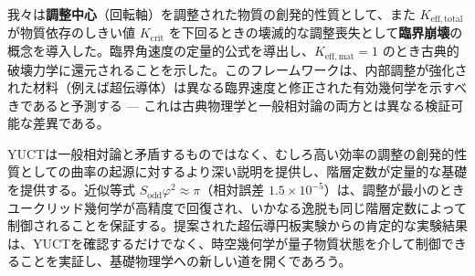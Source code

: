 \documentclass[12pt,a4paper]{article}
\newcommand{\Sodd}{S_{\mathrm{odd}}}
\newcommand{\Keffmat}{K_{\mathrm{eff,mat}}}
\newcommand{\Kefftot}{K_{\mathrm{eff,total}}}
\newcommand{\Kcrit}{K_{\mathrm{crit}}}
\begin{document}
	我々は\textbf{調整中心}（回転軸）を調整された物質の創発的性質として、また \(\Kefftot\) が物質依存のしきい値 \(\Kcrit\) を下回るときの壊滅的な調整喪失として\textbf{臨界崩壊}の概念を導入した。臨界角速度の定量的公式を導出し、\(\Keffmat=1\) のとき古典的破壊力学に還元されることを示した。このフレームワークは、内部調整が強化された材料（例えば超伝導体）は異なる臨界速度と修正された有効幾何学を示すべきであると予測する — これは古典物理学と一般相対論の両方とは異なる検証可能な差異である。
	
	YUCTは一般相対論と矛盾するものではなく、むしろ高い効率の調整の創発的性質としての曲率の起源に対するより深い説明を提供し、階層定数が定量的な基礎を提供する。近似等式 \(\Sodd \varphi^2 \approx \pi\)（相対誤差 \(1.5\times10^{-5}\)）は、調整が最小のときユークリッド幾何学が高精度で回復され、いかなる逸脱も同じ階層定数によって制御されることを保証する。提案された超伝導円板実験からの肯定的な実験結果は、YUCTを確認するだけでなく、時空幾何学が量子物質状態を介して制御できることを実証し、基礎物理学への新しい道を開くであろう。
	
\end{document}
